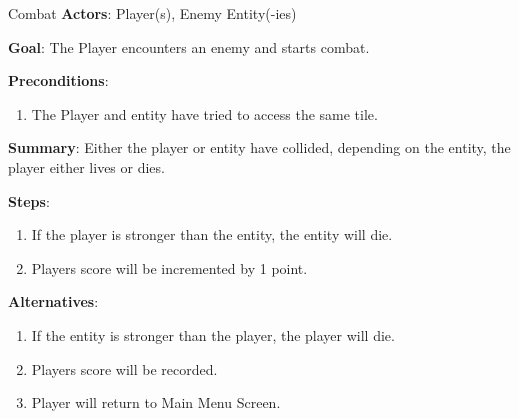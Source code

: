 \begin{subsection}{Combat}
\textbf{Actors}:
Player(s), Enemy Entity(-ies)

\textbf{Goal}:
The Player encounters an enemy and starts combat.

\textbf{Preconditions}:
\begin{enumerate}
\item The Player and entity have tried to access the same tile. 
\end{enumerate}

\textbf{Summary}:
Either the player or entity have collided, depending on the entity, the player either lives
or dies.

\textbf{Steps}:
\begin{enumerate}
\item If the player is stronger than the entity, the entity will die.
\item Players score will be incremented by 1 point.
\end{enumerate}

\textbf{Alternatives}:
\begin{enumerate}
\item If the entity is stronger than the player, the player will die.
\item Players score will be recorded.
\item Player will return to Main Menu Screen.
\end{enumerate}
\end{subsection}

